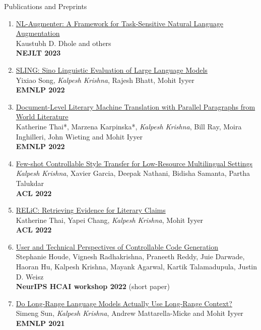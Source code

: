 \documentclass{resume} %
\begin{document}
\begin{rSection}{Publications and Preprints}
\begin{enumerate}[leftmargin=*]
\item \href{https://arxiv.org/abs/2112.02721}{NL-Augmenter: A Framework for Task-Sensitive Natural Language Augmentation} \\
Kaustubh D. Dhole and others \\
\textbf{NEJLT 2023}

\item \href{https://arxiv.org/abs/2210.11689}{SLING: Sino Linguistic Evaluation of Large Language Models} \\
Yixiao Song, \textit{Kalpesh Krishna}, Rajesh Bhatt, Mohit Iyyer \\
\textbf{EMNLP 2022}

\item \href{https://arxiv.org/abs/2210.14250}{Document-Level Literary Machine Translation with Parallel Paragraphs from World Literature} \\
Katherine Thai*, Marzena Karpinska*, \textit{Kalpesh Krishna}, Bill Ray, Moira Inghilleri, John Wieting and Mohit Iyyer \\
\textbf{EMNLP 2022}


\item \href{https://arxiv.org/abs/2110.07385}{Few-shot Controllable Style Transfer for Low-Resource Multilingual Settings} \\
\textit{Kalpesh Krishna}, Xavier Garcia, Deepak Nathani, Bidisha Samanta, Partha Talukdar \\
\textbf{ACL 2022}

\item \href{https://arxiv.org/abs/2203.10053}{RELiC: Retrieving Evidence for Literary Claims} \\
Katherine Thai, Yapei Chang, \textit{Kalpesh Krishna}, Mohit Iyyer \\
\textbf{ACL 2022}

\item \href{https://research.ibm.com/publications/user-and-technical-perspectives-of-controllable-code-generation}{User and Technical Perspectives of Controllable Code Generation} \\
Stephanie Houde, Vignesh Radhakrishna, Praneeth Reddy, Juie Darwade, Haoran Hu, Kalpesh Krishna, Mayank Agarwal, Kartik Talamadupula, Justin D. Weisz \\
\textbf{NeurIPS HCAI workshop 2022} (short paper)

\item \href{https://arxiv.org/abs/2109.09115}{Do Long-Range Language Models Actually Use Long-Range Context?} \\
Simeng Sun, \textit{Kalpesh Krishna}, Andrew Mattarella-Micke and Mohit Iyyer \\
\textbf{EMNLP 2021}


\end{enumerate}
\end{rSection}
\end{document}
